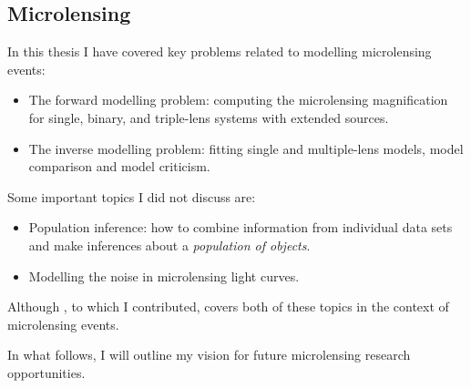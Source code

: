 \documentclass[12pt,dvipsnames]{report}
\begin{document}
\subsection{Microlensing}
In this thesis I have covered key problems related to modelling microlensing events: 
\begin{itemize}
    \item The forward modelling problem: computing the microlensing magnification for single,
    binary, and triple-lens systems with extended sources.
    \item The inverse modelling problem: fitting single and multiple-lens models, 
    model comparison and model criticism.
\end{itemize}
Some important topics I did not discuss are:
\begin{itemize}
\item Population inference: how to combine information from individual data sets and 
make inferences about a \emph{population of objects}. 
\item Modelling the noise in microlensing light curves.
\end{itemize}
Although \citet{golovich2022}, to which I contributed, covers both of these topics in the 
context of microlensing events.

In what follows, I will outline my vision for future microlensing research opportunities.
\end{document}
